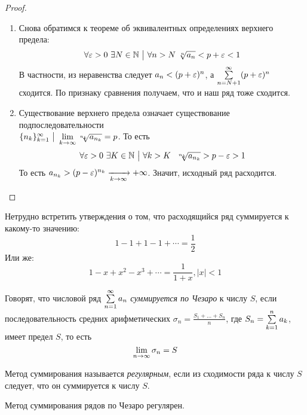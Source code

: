\begin{proof}~
	\begin{enumerate}
		\item Снова обратимся к теореме об эквивалентных определениях верхнего предела:
		\[
			\forall \varepsilon > 0\ \exists N \in \mathbb{N} \ \big|\  \forall n > N\ \sqrt[n]{a_n} < p + \varepsilon < 1
		\]
		В частности, из неравенства следует $a_n < (p + \varepsilon)^n$, а $\sum\limits_{n = N + 1}^\infty (p + \varepsilon)^n$ сходится. По признаку сравнения получаем, что и наш ряд тоже сходится.
		
		\item Существование верхнего предела означает существование подпоследовательности \\ $\{n_k\}_{k = 1}^\infty \ \big|\  \lim\limits_{k \to \infty} \sqrt[n_k]{a_{n_k}} = p$. То есть
		\[
			\forall \varepsilon > 0\ \exists K \in \mathbb{N} \ \big|\  \forall k > K\ \ \sqrt[n_k]{a_{n_k}} > p - \varepsilon > 1
		\]
		То есть $a_{n_k} > (p - \varepsilon)^{n_k} \xrightarrow[k \to \infty]{} +\infty$. Значит, исходный ряд расходится.
	\end{enumerate}
\end{proof}

\begin{example}
	Нетрудно встретить утверждения о том, что расходящийся ряд суммируется к какому-то значению:
	\[
		1 - 1 + 1 - 1 + \cdots = \frac{1}{2}
	\]
	Или же:
	\[
		1 - x + x^2 - x^3 + \cdots = \frac{1}{1 + x}, |x| < 1
	\]
\end{example}

\begin{definition}
	Говорят, что числовой ряд $\sum\limits_{n = 1}^\infty a_n$ \textit{суммируется по Чезаро} к числу $S$, если последовательность средних арифметических $\sigma_n = \frac{S_1 + \ldots + S_n}{n}$, где $S_n = \sum\limits_{k = 1}^n a_k$, имеет предел $S$, то есть
	\[
		\lim\limits_{n \to \infty} \sigma_n = S
	\]
\end{definition}

\begin{definition}
	Метод суммирования называется \textit{регулярным}, если из сходимости ряда к числу $S$ следует, что он суммируется к числу $S$.
\end{definition}

\begin{theorem}
	Метод суммирования рядов по Чезаро регулярен.
\end{theorem}

